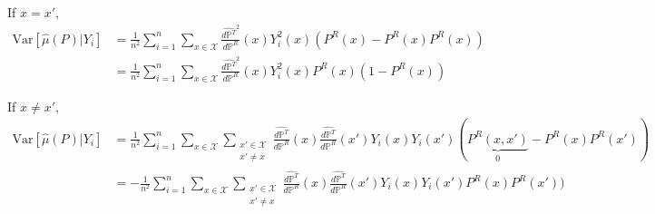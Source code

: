 \documentclass{article}
\begin{document}
If $x=x'$,
\begin{align*}
    \text{Var}[\hat{\mu}(P)|Y_i] &= \frac{1}{n^2}\sum_{i=1}^n\sum_{x \in \mathcal{X}}\frac{\hat{d \mathbb{P}^T}^2}{d \mathbb{P}^R}(x) Y_i^2(x)(P^R(x)-P^R(x)P^R(x)) \\
    &=\frac{1}{n^2}\sum_{i=1}^n\sum_{x \in \mathcal{X}}\frac{\hat{d \mathbb{P}^T}^2}{d \mathbb{P}^R}(x) Y_i^2(x)P^R(x)(1-P^R(x))
\end{align*}

If $x\neq x'$,
\begin{align*}
    \text{Var}[\hat{\mu}(P)|Y_i] &=\frac{1}{n^2}\sum_{i=1}^n\sum_{x \in \mathcal{X}}\sum_{\substack{x' \in \mathcal{X} \\ x' \neq x}} \frac{\hat{d \mathbb{P}^T}}{d \mathbb{P}^R}(x) \frac{\hat{d \mathbb{P}^T}}{d \mathbb{P}^R}(x')Y_i(x)Y_i(x')(\underbrace{P^R(x,x')}_{0}-P^R(x)P^R(x')) \\
    &=-\frac{1}{n^2}\sum_{i=1}^n\sum_{x \in \mathcal{X}}\sum_{\substack{x' \in \mathcal{X} \\ x' \neq x}} \frac{\hat{d \mathbb{P}^T}}{d \mathbb{P}^R}(x) \frac{\hat{d \mathbb{P}^T}}{d \mathbb{P}^R}(x')Y_i(x)Y_i(x')P^R(x)P^R(x')) \\
\end{align*}
\end{document}

